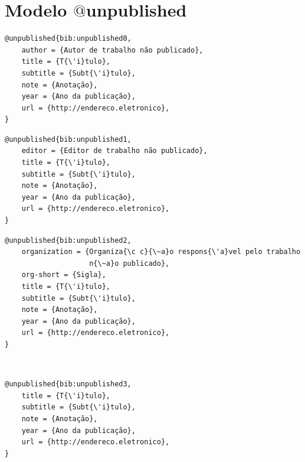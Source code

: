 \documentclass[a4paper,12pt,oneside,onecolumn,final,fleqn]{repUERJ}
\begin{document}
\section{Modelo $@$unpublished}

\noindent{}

\begin{verbatim}
@unpublished{bib:unpublished0,
    author = {Autor de trabalho não publicado},
    title = {T{\'i}tulo},
    subtitle = {Subt{\'i}tulo},
    note = {Anotação},
    year = {Ano da publicação},
    url = {http://endereco.eletronico},
}
\end{verbatim}

\noindent{}

\begin{verbatim}
@unpublished{bib:unpublished1,
    editor = {Editor de trabalho não publicado},
    title = {T{\'i}tulo},
    subtitle = {Subt{\'i}tulo},
    note = {Anotação},
    year = {Ano da publicação},
    url = {http://endereco.eletronico},
}
\end{verbatim}

\noindent{}

\begin{verbatim}
@unpublished{bib:unpublished2,
    organization = {Organiza{\c c}{\~a}o respons{\'a}vel pelo trabalho
                    n{\~a}o publicado},
    org-short = {Sigla},
    title = {T{\'i}tulo},
    subtitle = {Subt{\'i}tulo},
    note = {Anotação},
    year = {Ano da publicação},
    url = {http://endereco.eletronico},
}
\end{verbatim}

\noindent{}\\

\begin{verbatim}
@unpublished{bib:unpublished3,
    title = {T{\'i}tulo},
    subtitle = {Subt{\'i}tulo},
    note = {Anotação},
    year = {Ano da publicação},
    url = {http://endereco.eletronico},
}
\end{verbatim}

\end{document}

